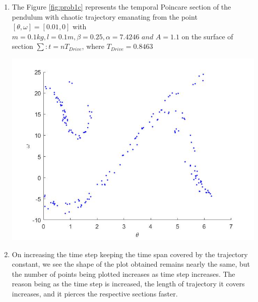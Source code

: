 \documentclass{article}
\begin{document}
\begin{enumerate}[label=(\alph*)]
\item
The Figure \ref{fig:prob1c} represents the temporal Poincare section of the pendulum with chaotic trajectory  emanating from the point $[\theta,\omega] = [0.01,0]$ with $m = 0.1kg, l = 0.1m, \beta = 0.25, \alpha = 7.4246 \,\,and\,\, A = 1.1$ on the surface of section $\sum :t = nT_{Drive}$, where $T_{Drive} = 0.8463$  \par\medskip
\begin{minipage}{\linewidth}
{
\centering 
\includegraphics[scale=0.4]{images/prob1c.jpg}
\label{fig:prob1c}
}
\end{minipage}

\item
On increasing the time step keeping the time span covered by the trajectory constant, we see the shape of the plot obtained remains nearly the same, but the number of points being plotted increases as time step increases. The reason being as the time step is increased, the length of trajectory it covers increases, and it pierces the respective sections faster.  

\end{enumerate}
\end{document}

